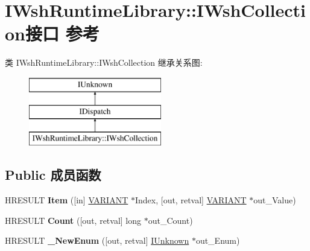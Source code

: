 \hypertarget{interface_i_wsh_runtime_library_1_1_i_wsh_collection}{}\section{I\+Wsh\+Runtime\+Library\+:\+:I\+Wsh\+Collection接口 参考}
\label{interface_i_wsh_runtime_library_1_1_i_wsh_collection}
类 I\+Wsh\+Runtime\+Library\+:\+:I\+Wsh\+Collection 继承关系图\+:\begin{figure}[H]
\begin{center}
\leavevmode
\includegraphics[height=3.000000cm]{interface_i_wsh_runtime_library_1_1_i_wsh_collection}
\end{center}
\end{figure}
\subsection*{Public 成员函数}
\begin{DoxyCompactItemize}
\item 
\mbox{\label{interface_i_wsh_runtime_library_1_1_i_wsh_collection_ae058c67bc8205dfeea76d9c01fc3b029}} 
H\+R\+E\+S\+U\+LT {\bfseries Item} (\mbox{[}in\mbox{]} \hyperlink{structtag_v_a_r_i_a_n_t}{V\+A\+R\+I\+A\+NT} $\ast$Index, \mbox{[}out, retval\mbox{]} \hyperlink{structtag_v_a_r_i_a_n_t}{V\+A\+R\+I\+A\+NT} $\ast$out\+\_\+\+Value)
\item 
\mbox{\label{interface_i_wsh_runtime_library_1_1_i_wsh_collection_abdf58a7bf6f93f2e3d371d12682c5de0}} 
H\+R\+E\+S\+U\+LT {\bfseries Count} (\mbox{[}out, retval\mbox{]} long $\ast$out\+\_\+\+Count)
\item 
\mbox{\label{interface_i_wsh_runtime_library_1_1_i_wsh_collection_ac575c2989d0be26cc9e3196a4e4fe48a}} 
H\+R\+E\+S\+U\+LT {\bfseries \+\_\+\+New\+Enum} (\mbox{[}out, retval\mbox{]} \hyperlink{interface_i_unknown}{I\+Unknown} $\ast$out\+\_\+\+Enum)
\end{DoxyCompactItemize}
